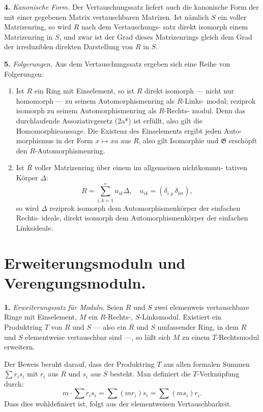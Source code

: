 \documentclass[12pt,a4paper]{article}
\theoremstyle{plain}
\newcommand{\Ga}{\mathfrak{G}}
\begin{document}
\medskip
\noindent\textbf{4.}\hspace{0.5em}%
\emph{Kanonische Form.} Der Vertauschungssatz liefert auch die kanonische
Form der mit einer gegebenen Matrix vertauschbaren Matrizen. Ist
n\"amlich $S$ ein voller Matrizenring, so wird $R$ nach dem Vertauschungs-
satz direkt isomorph einem Matrizenring in $S$, und zwar ist der Grad
dieses Matrizenrings gleich dem Grad der irreduziblen direkten Darstellung
von $R$ in $S$.

\medskip
\noindent\textbf{5.}\hspace{0.5em}%
\emph{Folgerungen.} Aus dem Vertauschungssatz ergeben sich eine Reihe
von Folgerungen:

\begin{enumerate}[label=\alph*)]
\item Ist $R$ ein Ring mit Einselement, so ist $R$ direkt isomorph ---
nicht nur homomorph --- zu seinem Automorphismenring als $R$-Links-
modul; reziprok isomorph zu seinem Automorphismenring als $R$-Rechts-
modul. Denn das durchlaufende Assoziativgesetz (2a*) ist erf\"ullt, also gilt die
Homomorphieaussage. Die Existenz des Einselements ergibt jeden Auto-
morphismus in der Form $x \mapsto xa$ aus $R$, also gilt Isomorphie und $\Ga$
ersch\"opft den $R$-Automorphismenring.

\item Ist $R$ voller Matrizenring \"uber einem im allgemeinen nichtkommu-
tativen K\"orper $\Delta$:
\[
R = \sum_{i,k=1}^{r} u_{ik} \Delta, \quad u_{ik} = (\delta_{i\varrho} \delta_{k\sigma}),\;
\]
so wird $\Delta$ reziprok isomorph dem Automorphismenk\"orper der einfachen Rechts-
ideale, direkt isomorph dem Automorphismenk\"orper der einfachen Linksideale.
\end{enumerate}

\section{Erweiterungsmoduln und Verengungsmoduln.}
\label{sec:erweiterung}

\medskip
\noindent\textbf{1.}\hspace{0.5em}%
\emph{Erweiterungssatz f\"ur Moduln.} Seien $R$ und $S$ zwei elemenweis
vertauschbare Ringe mit Einselement, $M$ ein $R$-Rechts-, $S$-Linksmodul.
Existiert ein Produktring $T$ von $R$ und $S$ --- also ein $R$ und $S$ umfassender
Ring, in dem $R$ und $S$ elementweise vertauschbar sind ---, so l\"a\ss t sich
$M$ zu einem $T$-Rechtsmodul erweitern.

Der Beweis beruht darauf, dass der Produktring $T$ aus allen formalen
Summen $\sum r_i s_i$ mit $r_i$ aus $R$ und $s_i$ aus $S$ besteht. Man definiert die
$T$-Verkn\"upfung durch:
\[
m \cdot \sum r_i s_i = \sum (m r_i) s_i = \sum (m s_i) r_i.
\]
Dass dies wohldefiniert ist, folgt aus der elementweisen Vertauschbarkeit.
\end{document}
